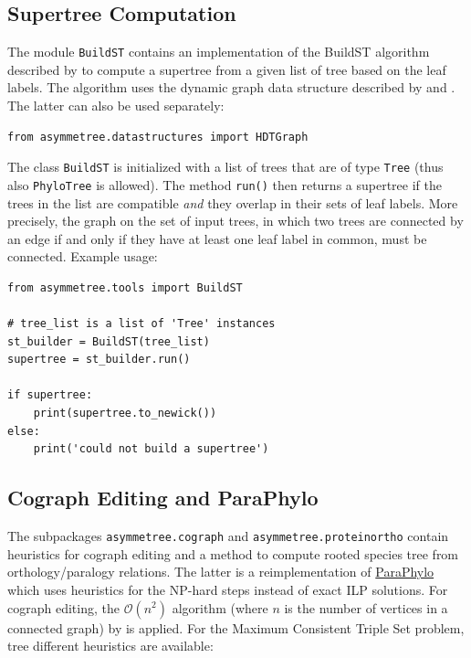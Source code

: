 \documentclass[hidelinks,11pt]{article}
\begin{document}
\subsection{Supertree Computation}

The module \texttt{BuildST} contains an implementation of the BuildST algorithm described by \citet{deng2016} to compute a supertree from a given list of tree based on the leaf labels.
The algorithm uses the dynamic graph data structure described by \citet{henzinger1995} and \citet{holm2001}.
The latter can also be used separately:

\begin{adjustwidth}{1cm}{1cm}\vspace{2mm}
\begin{verbatim}
from asymmetree.datastructures import HDTGraph
\end{verbatim}
\end{adjustwidth}

The class \texttt{BuildST} is initialized with a list of trees that are of type \texttt{Tree} (thus also \texttt{PhyloTree} is allowed).
The method \texttt{run()} then returns a supertree if the trees in the list are compatible \emph{and} they overlap in their sets of leaf labels.
More precisely, the graph on the set of input trees, in which two trees are connected by an edge if and only if they have at least one leaf label in common, must be connected.
Example usage:

\begin{adjustwidth}{1cm}{1cm}\vspace{2mm}
\begin{verbatim}
from asymmetree.tools import BuildST

# tree_list is a list of 'Tree' instances
st_builder = BuildST(tree_list)
supertree = st_builder.run()

if supertree:
    print(supertree.to_newick())
else:
    print('could not build a supertree')
\end{verbatim}
\end{adjustwidth}



\subsection{Cograph Editing and ParaPhylo}

The subpackages \texttt{asymmetree.cograph} and \texttt{asymmetree.proteinortho} contain heuristics for cograph editing and a method to compute rooted species tree from orthology/paralogy relations.
The latter is a reimplementation of \href{http://pacosy.informatik.uni-leipzig.de/208-0-ParaPhylo.html}{ParaPhylo} \citep{hellmuth2015} which uses heuristics for the NP-hard steps instead of exact ILP solutions.
For cograph editing, the $\mathcal{O}(n^2)$ algorithm (where $n$ is the number of vertices in a connected graph) by \citet{crespelle2019} is applied.
For the Maximum Consistent Triple Set problem, tree different heuristics are available:
\end{document}

